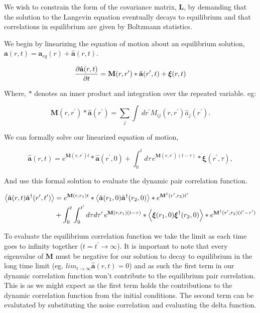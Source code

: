 We wish to constrain the form of the covariance matrix, $\mathbf{L}$, by demanding that the solution to the Langevin equation eventually decays to equilibrium and that correlations in equilibrium are given by Boltzmann statistics.

We begin by linearizing the equation of motion about an equilibrium solution, $\mathbf{a}(r, t) = \mathbf{a}_{eq}(r) + \hat{\mathbf{a}}(r, t)$.

\begin{equation}
	\frac{\partial \hat{\mathbf{a}} (r, t)}{\partial t} = \mathbf{M}(r, r^\prime) \ast \hat{\mathbf{a}}(r^\prime, t) + \boldsymbol{\xi}(r, t)
\end{equation}

Where, $\ast$ denotes an inner product and integration over the repeated variable. eg:

\begin{equation}
	\mathbf{M}(r, r^\prime)\ast \hat{\mathbf{a}}(r^\prime) = \sum_j \int\,dr^\prime M_{ij}(r, r^\prime) \hat{a}_j(r^\prime).
\end{equation}

We can formally solve our linearized equation of motion,

\begin{equation}
	\hat{\mathbf{a}}(r, t) = e^{\mathbf{M}(r, r^\prime)t}\ast\hat{\mathbf{a}}(r^\prime, 0) + \int_0^t d\tau\, e^{\mathbf{M}(r, r^\prime)(t-\tau)} \ast \boldsymbol{\xi} (r^\prime, \tau),
\end{equation}

And use this formal solution to evaluate the dynamic pair correlation function.

\begin{align}
	\left\langle \hat{\mathbf{a}}(r, t)\hat{\mathbf{a}}^\dagger(r^\prime, t^\prime) \right\rangle &= e^{\mathbf{M}(r, r_1)t}\ast\left\langle \hat{\mathbf{a}}(r_1, 0)\hat{\mathbf{a}}^\dagger(r_2, 0) \right\rangle \ast e^{\mathbf{M}^\dagger(r^\prime, r_2)t^\prime} \nonumber \\
	&+ \int_0^t \int_0^{t^\prime}d\tau d\tau^\prime\, e^{\mathbf{M}(r, r_1)(t-\tau)}\ast\left\langle \boldsymbol{\xi}(r_1, 0)\boldsymbol{\xi}^\dagger(r_2, 0) \right\rangle \ast e^{\mathbf{M}^\dagger(r^\prime, r_2)(t^\prime-\tau^\prime)}
\end{align}

To evaluate the equilibrium correlation function we take the limit as each time goes to infinity together ($t = t^\prime \rightarrow \infty$). It is important to note that every eigenvalue of $\mathbf{M}$ must be negative for our solution to decay to equilibrium in the long time limit (eg. $lim_{t\rightarrow\infty}\hat{\mathbf{a}}(r, t) = 0$) and as such the first term in our dynamic correlation function won't contribute to the equilibrium pair correlation. This is as we might expect as the first term holds the contributions to the dynamic correlation function from the initial conditions. The second term can be evalutated by substituting the noise correlation and evaluating the delta function.

